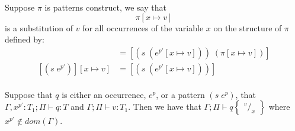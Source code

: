 \documentclass[../../master.tex]{subfiles}
\begin{document}
\begin{definition}
	Suppose $\pi$ is patterns construct, we say that
	$$\pi[x\mapsto v]$$
	is a substitution of $v$ for all occurrences of the variable $x$ on the structure of $\pi$ defined by:
	\begin{align*}
		[(s\;e^{p'})\;\pi][x\mapsto v]&=[(s\;(e^{p'}[x\mapsto v]))\;(\pi[x\mapsto v])]\\
		[(s\;e^{p'})][x\mapsto v]&=[(s\;(e^{p'}[x\mapsto v]))]\\
	\end{align*}
\end{definition}

\begin{lemma}
	Suppose that $q$ is either an occurrence, $e^p$, or a pattern $(s\;e^p)$, that 
	$\Gamma,x^{p'}:T_1;\Pi\vdash q:T$
	and 
	$\Gamma;\Pi\vdash v:T_1$.
	Then we have that
	$\Gamma;\Pi\vdash q\begin{Bmatrix} ^v/_x \end{Bmatrix}$
	where $x^{p'}\not\in dom(\Gamma)$.
\end{lemma}
\end{document}
